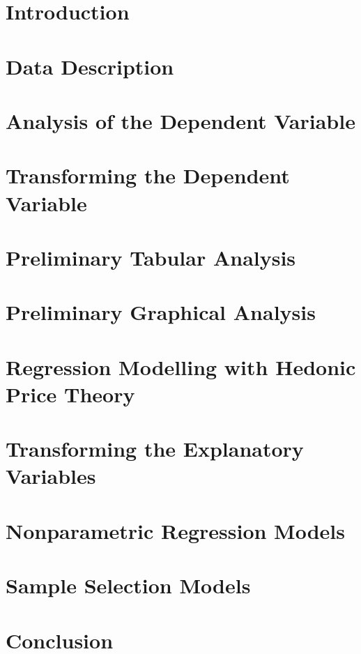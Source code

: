 \documentclass[11pt]{book}
\begin{document}



\pagebreak
\chapter{Introduction}


\pagebreak
\chapter{Data Description}


\pagebreak
\chapter{Analysis of the Dependent Variable}


\pagebreak
\chapter{Transforming the Dependent Variable}


\pagebreak
\chapter{Preliminary Tabular Analysis}


\pagebreak
\chapter{Preliminary Graphical Analysis}


\pagebreak
\chapter{Regression Modelling with Hedonic Price Theory}


\pagebreak
\chapter{Transforming the Explanatory Variables}


\pagebreak
\chapter{Nonparametric Regression Models}


\pagebreak
\chapter{Sample Selection Models}


\pagebreak
\chapter{Conclusion}


% 


\end{document}

